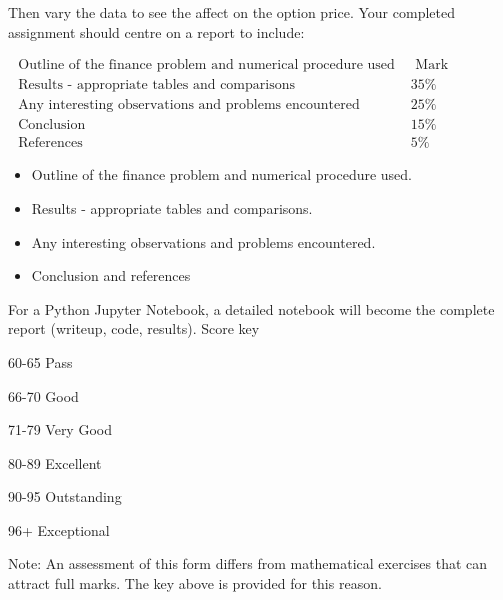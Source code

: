 \documentclass[10pt]{article}
\begin{document}
Then vary the data to see the affect on the option price. Your completed assignment should centre on a report to include:

$\begin{array}{ll}\text { Outline of the finance problem and numerical procedure used } & \text { Mark } \\ \text { Results - appropriate tables and comparisons } & 35 \% \\ \text { Any interesting observations and problems encountered } & 25 \% \\ \text { Conclusion } & 15 \% \\ \text { References } & 5 \%\end{array}$

\begin{itemize}
  \item Outline of the finance problem and numerical procedure used.

  \item Results - appropriate tables and comparisons.

  \item Any interesting observations and problems encountered.

  \item Conclusion and references

\end{itemize}

For a Python Jupyter Notebook, a detailed notebook will become the complete report (writeup, code, results). Score key

60-65 Pass

66-70 Good

71-79 Very Good

80-89 Excellent

90-95 Outstanding

96+ Exceptional

Note: An assessment of this form differs from mathematical exercises that can attract full marks. The key above is provided for this reason.
\end{document}
